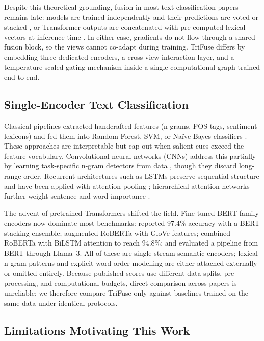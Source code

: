 \documentclass[10pt,twocolumn,a4paper]{article}
\begin{document}
Despite this theoretical grounding, fusion in most text classification papers remains late: models are trained independently and their predictions are voted or stacked \citep{ref14,ref36}, or Transformer outputs are concatenated with pre-computed lexical vectors at inference time \citep{ref15,ref16,ref33}. In either case, gradients do not flow through a shared fusion block, so the views cannot co-adapt during training. TriFuse differs by embedding three dedicated encoders, a cross-view interaction layer, and a temperature-scaled gating mechanism inside a single computational graph trained end-to-end.

\subsection{Single-Encoder Text Classification}\label{subsec:single_encoder}

Classical pipelines extracted handcrafted features (n-grams, POS tags, sentiment lexicons) and fed them into Random Forest, SVM, or Na\"ive Bayes classifiers \citep{ref2,ref5,ref6,ref18,ref31}. These approaches are interpretable but cap out when salient cues exceed the feature vocabulary. Convolutional neural networks (CNNs) address this partially by learning task-specific n-gram detectors from data \citep{ref7,ref26}, though they discard long-range order. Recurrent architectures such as LSTMs preserve sequential structure and have been applied with attention pooling \citep{ref8,ref13,ref32}; hierarchical attention networks further weight sentence and word importance \citep{ref30}.

The advent of pretrained Transformers shifted the field. Fine-tuned BERT-family encoders now dominate most benchmarks: \citet{ref14} reported 97.4\% accuracy with a BERT stacking ensemble; \citet{ref15} augmented RoBERTa with GloVe features; \citet{ref33} combined RoBERTa with BiLSTM attention to reach 94.8\%; and \citet{ref38} evaluated a pipeline from BERT through Llama~3. All of these are single-stream semantic encoders; lexical n-gram patterns and explicit word-order modelling are either attached externally or omitted entirely. Because published scores use different data splits, pre-processing, and computational budgets, direct comparison across papers is unreliable; we therefore compare TriFuse only against baselines trained on the same data under identical protocols.

\subsection{Limitations Motivating This Work}\label{subsec:limitations_lit}
\end{document}
